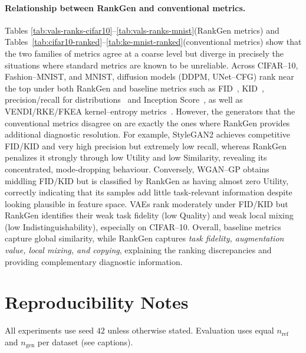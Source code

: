 \paragraph{Relationship between RankGen and conventional metrics.}
Tables \ref{tab:vals-ranks-cifar10}--\ref{tab:vals-ranks-mnist}(RankGen metrics) and Tables~\ref{tab:cifar10-ranked}--\ref{tab:ke-mnist-ranked}(conventional metrics) show
that the two families of metrics agree at a coarse level but diverge in
precisely the situations where standard metrics are known to be unreliable.
Across CIFAR--10, Fashion--MNIST, and MNIST, diffusion models (DDPM, UNet--CFG)
rank near the top under both RankGen and baseline metrics such as
FID~\citep{heusel2017gans}, KID~\citep{binkowski2018demystifying},
precision/recall for distributions~\citep{sajjadi2018assessing,kynkaanniemi2019improved}
and Inception Score~\citep{salimans2016improved}, as well as
VENDI/RKE/FKEA kernel–entropy metrics~\citep{friedman2023vendi,pasarkar2024cousins,jalali2024fkea,luo2024converge}.
However, the generators that the conventional metrics disagree on are exactly
the ones where RankGen provides additional diagnostic resolution. For example,
StyleGAN2 achieves competitive FID/KID and very high precision but extremely low
recall, whereas RankGen penalizes it strongly through low Utility and low
Similarity, revealing its concentrated, mode-dropping behaviour. Conversely,
WGAN--GP obtains middling FID/KID but is classified by RankGen as having almost
zero Utility, correctly indicating that its samples add little task-relevant
information despite looking plausible in feature space. VAEs rank moderately
under FID/KID but RankGen identifies their weak task fidelity (low Quality) and
weak local mixing (low Indistinguishability), especially on CIFAR--10. Overall,
baseline metrics capture global similarity, while RankGen captures
\emph{task fidelity, augmentation value, local mixing, and copying}, explaining
the ranking discrepancies and providing complementary diagnostic information.




\section{Reproducibility Notes}
All experiments use seed $42$ unless otherwise stated. Evaluation uses equal $n_{\text{ref}}$ and $n_{\text{gen}}$ per dataset (see captions). 

